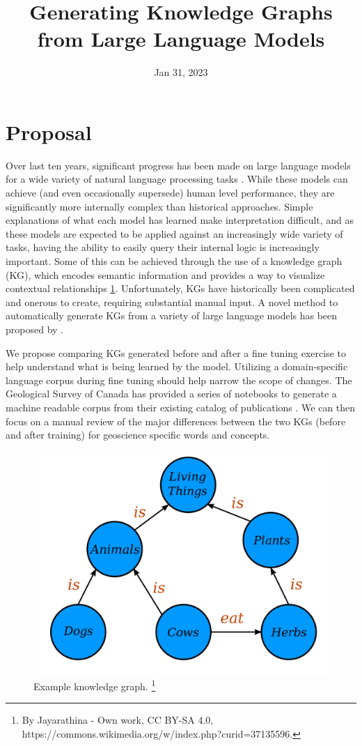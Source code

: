 \documentclass[11pt,a4paper]{article}
\title{Generating Knowledge Graphs from Large Language Models}
\date{Jan 31, 2023}
\begin{document}
\maketitle
\section{Proposal}
Over last ten years, significant progress has been made on large language models for a wide variety of natural language processing tasks \cite{Min2021}. While these models can achieve (and even occasionally supersede) human level performance, they are significantly more internally complex than historical approaches. Simple explanations of what each model has learned make interpretation difficult, and as these models are expected to be applied against an increasingly wide variety of tasks, having the ability to easily query their internal logic is increasingly important. Some of this can be achieved through the use of a knowledge graph (KG), which encodes semantic information and provides a way to visualize contextual relationships \ref{KGfig}. Unfortunately, KGs have historically been complicated and onerous to create, requiring substantial manual input. A novel method to automatically generate KGs from a variety of large language models has been proposed by \cite{hao2022}. \par


We propose comparing KGs generated before and after a fine tuning exercise to help understand what is being learned by the model. Utilizing a domain-specific language corpus during fine tuning should help narrow the scope of changes. The Geological Survey of Canada has provided a series of notebooks to generate a machine readable corpus from their existing catalog of publications \cite{Raimondo2022}. We can then focus on a manual review of the major differences between the two KGs (before and after training) for geoscience specific words and concepts. \par

\begin{figure}
  \includegraphics[width=\columnwidth]{KG}
  \caption{Example knowledge graph. \footnote{By Jayarathina - Own work, CC BY-SA 4.0, https://commons.wikimedia.org/w/index.php?curid=37135596.}}
  \label{KGfig}
\end{figure}



\end{document}
